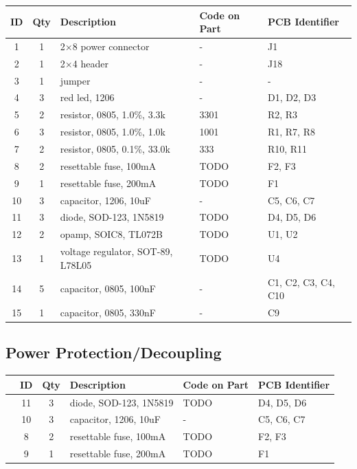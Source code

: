 \documentclass[12pt, a4paper]{article}
\newcommand{\checkbox}[1]{\CheckBox[backgroundcolor=0.86 0.828 0.71, name=#1]{}}
\begin{document}
\begin{center}
    \small
    \setlength\extrarowheight{3pt}
    \begin{tabularx}{\textwidth}{|c|c|X|l|l|}
        \hline \rowcolor{lightgray} ID & Qty & Description & Code on Part & PCB Identifier\\
        \hline  1 & 1 & 2×8 power connector & - & J1\\
        \hline  2 & 1 & 2×4 header & - & J18\\
        \hline  3 & 1 & jumper & - & -\\
        \hline  4 & 3 & red led, 1206 & - & D1, D2, D3\\
        \hline  5 & 2 & resistor, 0805, 1.0\%, 3.3k & 3301 & R2, R3\\
        \hline  6 & 3 & resistor, 0805, 1.0\%, 1.0k & 1001 & R1, R7, R8\\
        \hline  7 & 2 & resistor, 0805, 0.1\%, 33.0k & 333 & R10, R11\\
        \hline  8 & 2 & resettable fuse, 100mA & TODO & F2, F3\\
        \hline  9 & 1 & resettable fuse, 200mA & TODO & F1\\
        \hline 10 & 3 & capacitor, 1206, 10uF & - & C5, C6, C7\\
        \hline 11 & 3 & diode, SOD-123, 1N5819 & TODO & D4, D5, D6\\
        \hline 12 & 2 & opamp, SOIC8, TL072B & TODO & U1, U2\\
        \hline 13 & 1 & voltage regulator, SOT-89, L78L05 & TODO & U4\\
        \hline 14 & 5 & capacitor, 0805, 100nF & - & C1, C2, C3, C4, C10\\
        \hline 15 & 1 & capacitor, 0805, 330nF & - & C9\\
        \hline
    \end{tabularx}
\end{center}

\pagebreak

\subsection{Power Protection/Decoupling}

\begin{center}
    \small
    \setlength\extrarowheight{8pt}
    \begin{tabularx}{\textwidth}{|c|c|c|X|l|l|}
        \hline\rowcolor{lightgray} & ID & Qty & Description & Code on Part & PCB Identifier\\
        \hline\checkbox{aa} & 11 & 3 & diode, SOD-123, 1N5819 & TODO & D4, D5, D6\\
        \hline\checkbox{ab} & 10 & 3 & capacitor, 1206, 10uF & - & C5, C6, C7\\
        \hline\checkbox{ac} &  8 & 2 & resettable fuse, 100mA & TODO & F2, F3\\
        \hline\checkbox{ad} &  9 & 1 & resettable fuse, 200mA & TODO & F1\\
        \hline
    \end{tabularx}
\end{center}
\end{document}
